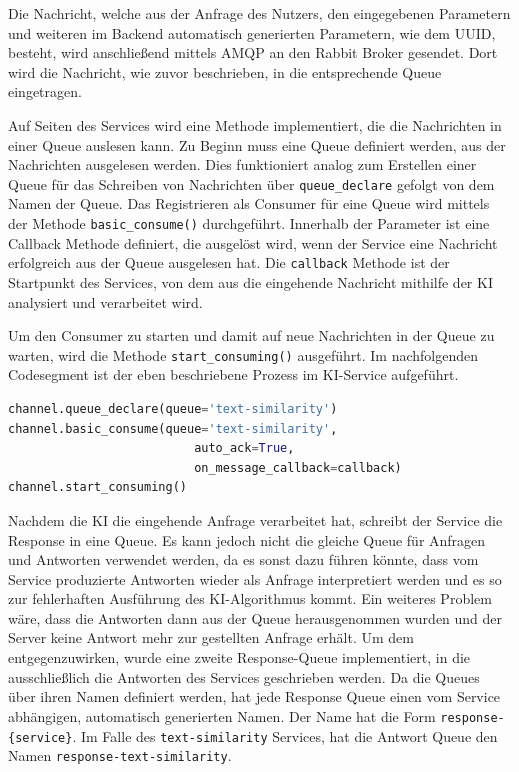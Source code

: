 Die Nachricht, welche aus der Anfrage des Nutzers, den eingegebenen Parametern und weiteren im Backend automatisch generierten Parametern, wie dem UUID, besteht, wird anschließend mittels AMQP an den Rabbit Broker gesendet. Dort wird die Nachricht, wie zuvor beschrieben, in die entsprechende Queue eingetragen. 

Auf Seiten des Services wird eine Methode implementiert, die die Nachrichten in einer Queue auslesen kann. Zu Beginn muss eine Queue definiert werden, aus der Nachrichten ausgelesen werden. Dies funktioniert analog zum Erstellen einer Queue für das Schreiben von Nachrichten über \texttt{queue\_{}declare} gefolgt von dem Namen der Queue. Das Registrieren als Consumer für eine Queue wird mittels der Methode \texttt{basic\_{}consume()} durchgeführt. Innerhalb der Parameter ist eine Callback Methode definiert, die ausgelöst wird, wenn der Service eine Nachricht erfolgreich aus der Queue ausgelesen hat. Die \texttt{callback} Methode ist der Startpunkt des Services, von dem aus die eingehende Nachricht mithilfe der KI analysiert und verarbeitet wird.

Um den Consumer zu starten und damit auf neue Nachrichten in der Queue zu warten, wird die Methode \texttt{start\_{}consuming()} ausgeführt. Im nachfolgenden Codesegment ist der eben beschriebene Prozess im KI-Service aufgeführt.

\begin{lstlisting}[language=Python, caption={Aufsetzen und Konsumieren der RabbitMQ-Queue im KI-Service}]
channel.queue_declare(queue='text-similarity')
channel.basic_consume(queue='text-similarity',
                          auto_ack=True,
                          on_message_callback=callback)
channel.start_consuming()
\end{lstlisting}

Nachdem die KI die eingehende Anfrage verarbeitet hat, schreibt der Service die Response in eine Queue. Es kann jedoch nicht die gleiche Queue für Anfragen und Antworten verwendet werden, da es sonst dazu führen könnte, dass vom Service produzierte Antworten wieder als Anfrage interpretiert werden und es so zur fehlerhaften Ausführung des KI-Algorithmus kommt. Ein weiteres Problem wäre, dass die Antworten dann aus der Queue herausgenommen wurden und der Server keine Antwort mehr zur gestellten Anfrage erhält. Um dem entgegenzuwirken, wurde eine zweite \glqq Response-Queue\grqq{} implementiert, in die ausschließlich die Antworten des Services geschrieben werden. Da die Queues über ihren Namen definiert werden, hat jede Response Queue einen vom Service abhängigen, automatisch generierten Namen. Der Name hat die Form \texttt{response-\{service\}}. Im Falle des \texttt{text-similarity} Services, hat die Antwort Queue den Namen \texttt{response-text-similarity}. 

